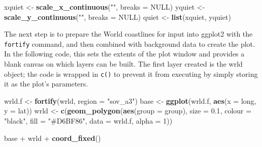 \documentclass[]{article}
\newenvironment{Shaded}{}{}
\newcommand{\KeywordTok}[1]{\textcolor[rgb]{0.00,0.44,0.13}{\textbf{{#1}}}}
\newcommand{\DataTypeTok}[1]{\textcolor[rgb]{0.56,0.13,0.00}{{#1}}}
\newcommand{\DecValTok}[1]{\textcolor[rgb]{0.25,0.63,0.44}{{#1}}}
\newcommand{\FloatTok}[1]{\textcolor[rgb]{0.25,0.63,0.44}{{#1}}}
\newcommand{\StringTok}[1]{\textcolor[rgb]{0.25,0.44,0.63}{{#1}}}
\newcommand{\OtherTok}[1]{\textcolor[rgb]{0.00,0.44,0.13}{{#1}}}
\newcommand{\NormalTok}[1]{{#1}}
\begin{document}
\begin{Shaded}
\begin{Highlighting}[]
\NormalTok{xquiet <- }\KeywordTok{scale_x_continuous}\NormalTok{(}\StringTok{""}\NormalTok{, }\DataTypeTok{breaks =} \OtherTok{NULL}\NormalTok{)}
\NormalTok{yquiet <- }\KeywordTok{scale_y_continuous}\NormalTok{(}\StringTok{""}\NormalTok{, }\DataTypeTok{breaks =} \OtherTok{NULL}\NormalTok{)}
\NormalTok{quiet <- }\KeywordTok{list}\NormalTok{(xquiet, yquiet)}
\end{Highlighting}
\end{Shaded}

The next step is to prepare the World coastlines for input into ggplot2 with the \texttt{fortify}  command, and then combined with background data to create the plot. In the following code, this sets the extents of the plot window and provides a
blank canvas on which layers can be built. The first layer
created is the wrld object; the code is wrapped in \texttt{c()} to
prevent it from executing by simply storing it as the plot's parameters.

\begin{Shaded}
\begin{Highlighting}[]
\NormalTok{wrld.f <- }\KeywordTok{fortify}\NormalTok{(wrld, }\DataTypeTok{region =} \StringTok{"sov_a3"}\NormalTok{)}
\NormalTok{base <- }\KeywordTok{ggplot}\NormalTok{(wrld.f, }\KeywordTok{aes}\NormalTok{(}\DataTypeTok{x =} \NormalTok{long, }\DataTypeTok{y =} \NormalTok{lat))}
\NormalTok{wrld <- }\KeywordTok{c}\NormalTok{(}\KeywordTok{geom_polygon}\NormalTok{(}\KeywordTok{aes}\NormalTok{(}\DataTypeTok{group =} \NormalTok{group), }\DataTypeTok{size =} \FloatTok{0.1}\NormalTok{, }\DataTypeTok{colour =} \StringTok{"black"}\NormalTok{, }\DataTypeTok{fill =} \StringTok{"#D6BF86"}\NormalTok{, }
    \DataTypeTok{data =} \NormalTok{wrld.f, }\DataTypeTok{alpha =} \DecValTok{1}\NormalTok{))}
\end{Highlighting}
\end{Shaded}


\begin{Shaded}
\begin{Highlighting}[]
\NormalTok{base + wrld + }\KeywordTok{coord_fixed}\NormalTok{()}
\end{Highlighting}
\end{Shaded}
\end{document}
